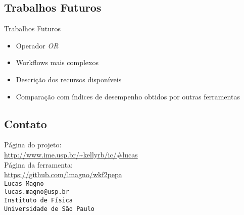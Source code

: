 \documentclass[xcolor=x11names,compress]{beamer}
\renewcommand{\(}{\begin{columns}}
\renewcommand{\)}{\end{columns}}
\newcommand{\<}[1]{\begin{column}{#1}}
\renewcommand{\>}{\end{column}}
\begin{document}
    \subsection{Trabalhos Futuros}
        \begin{frame}{Trabalhos Futuros}
            \begin{itemize}[<+->]
                \item Operador \emph{OR}
                \item Workflows mais complexos
                \item Descrição dos recursos disponíveis
                \item Comparação com índices de desempenho obtidos por outras ferramentas
            \end{itemize}
        \end{frame}

    \subsection{Contato}
        \begin{frame}{}
            \vspace{1cm}
            Página do projeto:\\
            \url{http://www.ime.usp.br/~kellyrb/ic/#lucas}\\
            \vspace{0.2cm}
            Página da ferramenta: \\
            \url{https://github.com/lmagno/wkf2pepa}\\
            \vspace{2.5cm}
            \texttt{Lucas Magno\\
            lucas.magno@usp.br\\
            Instituto de Física\\
            Universidade de São Paulo}
        \end{frame}
\end{document}
